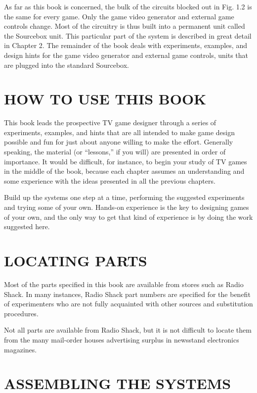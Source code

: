 \documentclass[11pt]{book}              %
\begin{document}
As far as this book is concerned, the bulk of the circuits blocked out in Fig. 1.2 is the same for every game. Only the game video generator and external game controls change. Most of the circuitry is thus built into a permanent unit called the Sourcebox unit. This particular part of the system is described in great detail in Chapter 2. The remainder of the book deals with experiments, examples, and design hints for the game video generator and external game controls, units that are plugged into the standard Sourcebox.


\section{HOW TO USE THIS BOOK}

This book leads the prospective TV game designer through a series of experiments, examples, and hints that are all intended to make game design possible and fun for just about anyone willing to make the effort. Generally speaking, the material (or “lessons,” if you will) are presented in order of importance. It would be difficult, for instance, to begin your study of TV games in the middle of the book, because each chapter assumes an understanding and some experience with the ideas presented in all the previous chapters.

Build up the systems one step at a time, performing the suggested experiments and trying some of your own. Hands-on experience is the key to designing games of your own, and the only way to get that kind of experience is by doing the work suggested here.


\section{LOCATING PARTS}

Most of the parts specified in this book are available from stores such as Radio Shack. In many instances, Radio Shack part numbers are specified for the benefit of experimenters who are not fully acquainted with other sources and substitution procedures.

Not all parts are available from Radio Shack, but it is not difficult to locate them from the many mail-order houses advertising surplus in newsstand electronics magazines.


\section{ASSEMBLING THE SYSTEMS}
\end{document}
